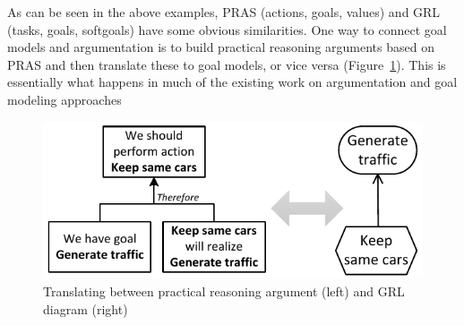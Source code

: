 As can be seen in the above examples, PRAS (actions, goals, values) and GRL (tasks, goals, softgoals) have some obvious similarities. One way to connect goal models and argumentation is to build practical reasoning arguments based on PRAS and then translate these to goal models, or vice versa (Figure~\ref{fig:pras:example3}). This is essentially what happens in much of the existing work on argumentation and goal modeling approaches \cite{Jureta:RE2008,vanzee-etal:renext2015,vanZee-etal:er2016} 

\begin{figure}[ht]
\centering
\includegraphics[width=\columnwidth]{img/Fig3}
\caption{Translating between practical reasoning argument (left) and GRL diagram (right)}
\label{fig:pras:example3}
\end{figure}  




